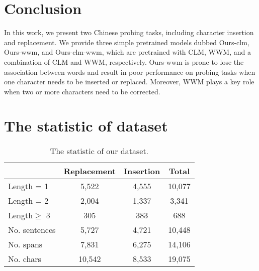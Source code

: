 \documentclass[11pt]{article}
\begin{document}
\section{Conclusion}
In this work, we present two Chinese probing tasks, including character insertion and replacement. We provide three simple pretrained models dubbed Ours-clm, Ours-wwm, and Ours-clm-wwm, which are pretrained with CLM, WWM, and a combination of CLM and WWM, respectively. Ours-wwm is prone to lose the association between words and result in poor performance on probing tasks when one character needs to be inserted or replaced. Moreover, WWM plays a key role when two or more characters need to be corrected. 




\clearpage
\appendix
\section{The statistic of dataset}\label{statistic}
\begin{table}[htbp]
\small
  \centering
    \begin{tabular}{l|ccc}
    \toprule
          & Replacement & Insertion & Total\\
    \midrule
    Length = 1 & 5,522  & 4,555 & 10,077\\
    Length = 2 & 2,004  & 1,337 & 3,341\\
    Length$\geq$ 3 & 305 & 383 & 688\\
        \midrule
    No. sentences  & 5,727 & 4,721 & 10,448\\
    No. spans &7,831 & 6,275 &14,106\\
    No. chars  & 10,542 & 8,533 &19,075\\
    \bottomrule
    \end{tabular}%
    \caption{The statistic of our dataset.}
  \label{tab:statistic}%
\end{table}%
\end{document}
